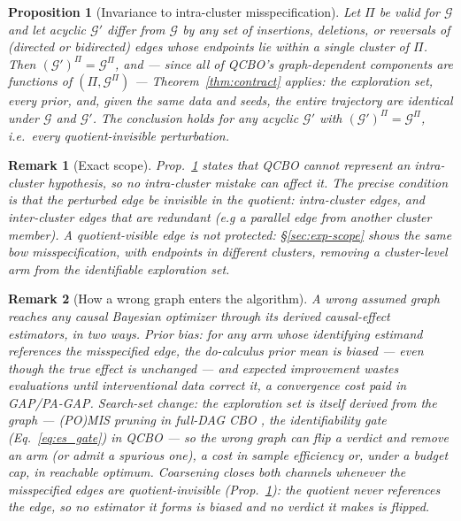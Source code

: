 \documentclass[twoside]{article}
\newtheorem{proposition}{Proposition}
\newtheorem{remark}{Remark}
\newcommand{\QCBO}{\textsc{QCBO}}
\newcommand{\CBO}{\textsc{CBO}}
\newcommand{\Gg}{\mathcal{G}}
\newcommand{\Gq}{\mathcal{G}^{\Pi}}
\begin{document}
\begin{proposition}[Invariance to intra-cluster misspecification]
\label{prop:invariance}
Let $\Pi$ be valid for $\Gg$ and let acyclic $\Gg'$ differ from $\Gg$ by any set of insertions, deletions, or reversals of (directed or bidirected) edges whose endpoints lie within a single cluster of $\Pi$. Then $(\Gg')^{\Pi}=\Gq$, and --- since all of \QCBO{}'s graph-dependent components are functions of $(\Pi,\Gq)$ --- Theorem~\ref{thm:contract} applies: the exploration set, every prior, and, given the same data and seeds, the entire trajectory are identical under $\Gg$ and $\Gg'$. The conclusion holds for any acyclic $\Gg'$ with $(\Gg')^{\Pi}=\Gq$, i.e.\ every quotient-invisible perturbation.
\end{proposition}

\begin{remark}[Exact scope]
\label{rem:structural_robustness}
Prop.~\ref{prop:invariance} states that \QCBO{} cannot represent an intra-cluster hypothesis, so no intra-cluster mistake can affect it. The precise condition is that the perturbed edge be invisible in the quotient: intra-cluster edges, and inter-cluster edges that are redundant (e.g a parallel edge from another cluster member). A quotient-visible edge is not protected: \S\ref{sec:exp-scope} shows the same bow misspecification, with endpoints in different clusters, removing a cluster-level arm from the identifiable exploration set.
\end{remark}

\begin{remark}[How a wrong graph enters the algorithm]
\label{rem:taxonomy}
A wrong assumed graph reaches any causal Bayesian optimizer through its derived causal-effect estimators, in two ways. \emph{Prior bias:} for any arm whose identifying estimand references the misspecified edge, the do-calculus prior mean is biased --- even though the \emph{true} effect is unchanged --- and expected improvement wastes evaluations until interventional data correct it, a convergence cost paid in GAP/PA-GAP. \emph{Search-set change:} the exploration set is itself derived from the graph --- (PO)MIS pruning in full-DAG \CBO{} \citep{lee2018structural,aglietti2020causal}, the identifiability gate (Eq.~\ref{eq:es_gate}) in \QCBO{} --- so the wrong graph can flip a verdict and remove an arm (or admit a spurious one), a cost in sample efficiency or, under a budget cap, in reachable optimum. Coarsening closes both channels whenever the misspecified edges are quotient-invisible (Prop.~\ref{prop:invariance}): the quotient never references the edge, so no estimator it forms is biased and no verdict it makes is flipped.
\end{remark}
\end{document}
